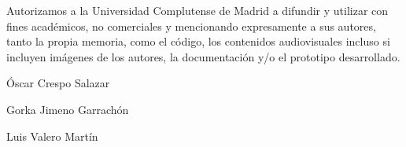 \noindent Autorizamos a la Universidad Complutense de Madrid a difundir y utilizar con fines acad\'emicos, no comerciales y mencionando expresamente a sus autores, tanto la propia memoria, como el c\'odigo, los contenidos audiovisuales incluso si incluyen im\'agenes de los autores, la documentaci\'on y/o el prototipo desarrollado.\\

\vspace*{5cm}\par

\'Oscar Crespo Salazar 

\vspace*{5cm}\par 

Gorka Jimeno Garrach\'on

\vspace*{5cm}\par 

Luis Valero Mart\'in
